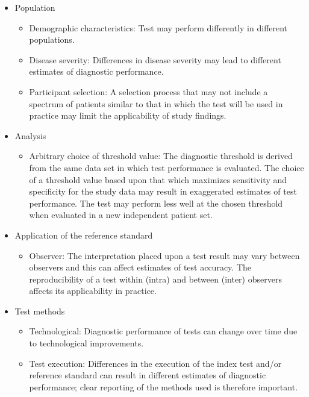 \documentclass[
  10pt,
  a4paper,
  DIV=11,
  numbers=noendperiod]{scrreprt}
\providecommand{\tightlist}{%
  \setlength{\itemsep}{0pt}\setlength{\parskip}{0pt}}
\begin{document}
\begin{itemize}
\item
  Population

  \begin{itemize}
  \item
    Demographic characteristics: Test may perform differently in
    different populations.
  \item
    Disease severity: Differences in disease severity may lead to
    different estimates of diagnostic performance.
  \item
    Participant selection: A selection process that may not include a
    spectrum of patients similar to that in which the test will be used
    in practice may limit the applicability of study findings.
  \end{itemize}
\item
  Analysis

  \begin{itemize}
  \tightlist
  \item
    Arbitrary choice of threshold value: The diagnostic threshold is
    derived from the same data set in which test performance is
    evaluated. The choice of a threshold value based upon that which
    maximizes sensitivity and specificity for the study data may result
    in exaggerated estimates of test performance. The test may perform
    less well at the chosen threshold when evaluated in a new
    independent patient set.
  \end{itemize}
\item
  Application of the reference standard

  \begin{itemize}
  \tightlist
  \item
    Observer: The interpretation placed upon a test result may vary
    between observers and this can affect estimates of test accuracy.
    The reproducibility of a test within (intra) and between (inter)
    observers affects its applicability in practice.
  \end{itemize}
\item
  Test methods

  \begin{itemize}
  \item
    Technological: Diagnostic performance of tests can change over time
    due to technological improvements.
  \item
    Test execution: Differences in the execution of the index test
    and/or reference standard can result in different estimates of
    diagnostic performance; clear reporting of the methods used is
    therefore important.
  \end{itemize}
\end{itemize}
\end{document}
